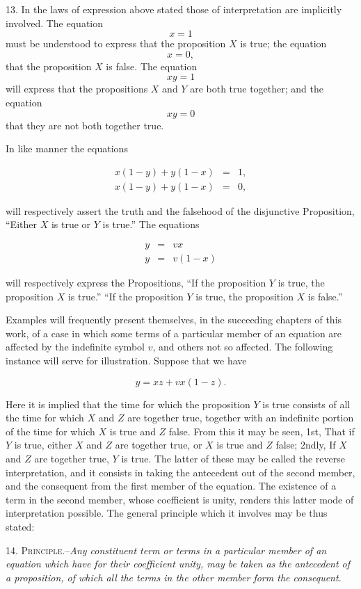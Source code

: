 \documentclass[oneside]{book}
\begin{document}
13. In the laws of expression above stated those of interpretation
are implicitly involved. The equation
\[
x= 1
\]
must be understood to express that the proposition $X$ is true;
the equation
\[
x = 0,
\]
that the proposition $X$ is false. The equation
\[
xy= 1
\]
will express that the propositions $X$ and $Y$ are both true together;
and the equation
\[
xy= 0
\]
that they are not both together true.

In like manner the equations

\begin{eqnarray*}
x(1-y) + y(1-x) &=& 1,\\
x (1 - y) + y (1 - x) &=& 0,
\end{eqnarray*}

will respectively assert the truth and the falsehood of the disjunctive
Proposition, ``Either $X$ is true or $Y$ is true.'' The equations

\begin{eqnarray*}
y &=& vx \\
y &=& v(1-x)
\end{eqnarray*}

will respectively express the Propositions, ``If the proposition $Y$
is true, the proposition $X$ is true.'' ``If the proposition $Y$ is
true, the proposition $X$ is false.''

Examples will frequently present themselves, in the succeeding
chapters of this work, of a case in which some terms of a
particular member of an equation are affected by the indefinite
symbol $v$, and others not so affected. The following instance
will serve for illustration. Suppose that we have

\[
y = xz + vx (1 - z).
\]

Here it is implied that the time for which the proposition $Y$ is
true consists of all the time for which $X$ and $Z$ are together true,
together with an indefinite portion of the time for which $X$ is
true and $Z$ false. From this it may be seen, 1st, That if $Y$ is
true, either $X$ and $Z$ are together true, or $X$ is true and $Z$ false;
2ndly, If $X$ and $Z$ are together true, $Y$ is true. The latter of
these may be called the reverse interpretation, and it consists in
taking the antecedent out of the second member, and the consequent from the first member of the equation. The existence of
a term in the second member, whose coefficient is unity, renders
this latter mode of interpretation possible. The general principle
which it involves may be thus stated:

14. \textsc{Principle}.--\textit{Any constituent term or terms in a particular
member of an equation which have for their coefficient unity, may
be taken as the antecedent of a proposition, of which all the terms
in the other member form the consequent.}
\end{document}
